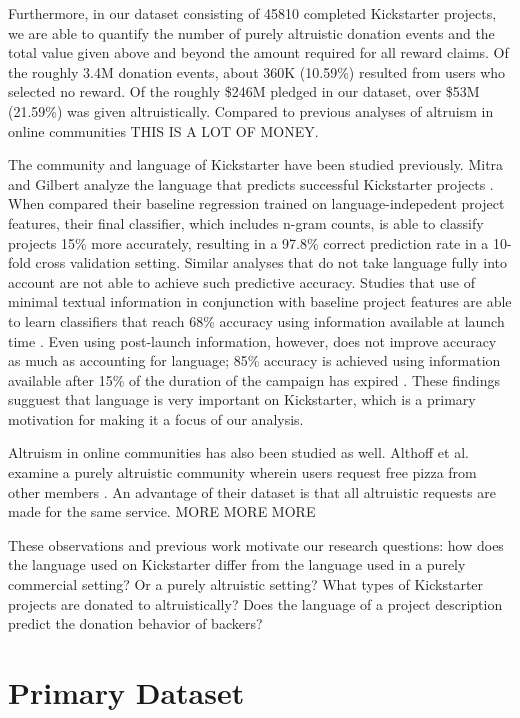 \documentclass[letterpaper]{article}
\begin{document}
Furthermore, in our dataset consisting of 45810 completed Kickstarter projects, we are able to quantify the number of purely altruistic donation events and the total value given above and beyond the amount required for all reward claims. Of the roughly 3.4M donation events, about 360K (10.59\%) resulted from users who selected no reward. Of the roughly \$246M pledged in our dataset, over \$53M (21.59\%) was given altruistically. Compared to previous analyses of altruism in online communities THIS IS A LOT OF MONEY.

The community and language of Kickstarter have been studied previously. Mitra and Gilbert analyze the language that predicts successful Kickstarter projects \cite{mitra2014language}. When compared their baseline regression trained on language-indepedent project features, their final classifier, which includes n-gram counts, is able to classify projects 15\% more accurately, resulting in a 97.8\% correct prediction rate in a 10-fold cross validation setting. Similar analyses that do not take language fully into account are not able to achieve such predictive accuracy. Studies that use of minimal textual information in conjunction with baseline project features are able to learn classifiers that reach 68\% accuracy using information available at launch time \cite{greenberg2013crowdfunding}. Even using post-launch information, however, does not improve accuracy as much as accounting for language; 85\% accuracy is achieved using information available after 15\% of the duration of the campaign has expired \cite{etter2013launch}. These findings sugguest that language is very important on Kickstarter, which is a primary motivation for making it a focus of our analysis.

Altruism in online communities has also been studied as well. Althoff et al. examine a purely altruistic community wherein users request free pizza from other members \cite{althoff2014ask}. An advantage of their dataset is that all altruistic requests are made for the same service. MORE MORE MORE

These observations and previous work motivate our research questions: how does the language used on Kickstarter differ from the language used in a purely commercial setting? Or a purely altruistic setting? What types of Kickstarter projects are donated to altruistically? Does the language of a project description predict the donation behavior of backers?

\section{Primary Dataset}
\end{document}

